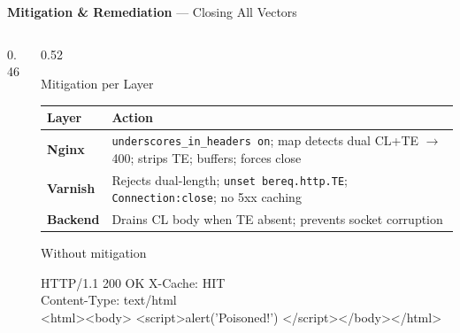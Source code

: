 \documentclass[aspectratio=169,10pt]{beamer}
\begin{document}
\begin{frame}{\textbf{Mitigation \& Remediation} --- Closing All Vectors}
\begin{columns}[T,totalwidth=\textwidth]
\begin{column}{0.46\textwidth}
\end{column}

\begin{column}{0.52\textwidth}

\begin{block}{\small Mitigation per Layer}
\vspace{1mm}
{\small
\begin{tabular}{@{}>{\bfseries}p{1.4cm} p{5cm}@{}}
\toprule
Layer & Action \\
\midrule
Nginx &
  \texttt{underscores\_in\_headers on}; map detects dual CL+TE
  $\rightarrow$ 400; strips TE; buffers; forces close \\[3pt]
Varnish &
  Rejects dual-length; \texttt{unset bereq.http.TE};
  \texttt{Connection:close}; no 5xx caching \\[3pt]
Backend &
  Drains CL body when TE absent; prevents socket corruption \\
\bottomrule
\end{tabular}
}
\end{block}

\vspace{1.5mm}

\begin{alertblock}{\small Without mitigation}
\vspace{1mm}
{\ttfamily\tiny
\colorbox{codebg}{\parbox{\dimexpr\linewidth-2\fboxsep-2pt}{%
  \color{accentlight}%
  HTTP/1.1 200 OK \quad X-Cache: HIT\\
  Content-Type: text/html\\[2pt]
  \color{danger}%
  \textless html\textgreater\textless body\textgreater%
  \textless script\textgreater alert('Poisoned!')%
  \textless/script\textgreater\textless/body\textgreater\textless/html\textgreater
}}}
\vspace{1mm}
\end{alertblock}

\vspace{0.5mm}


\end{column}
\end{columns}
\end{frame}
\end{document}
